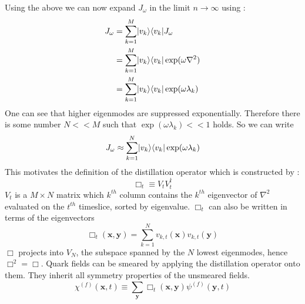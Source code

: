     Using the above we can now expand $J_\omega$ in the limit $n\rightarrow\infty$ using :
    \begin{equation}
        \begin{aligned}
            J_\omega &= \sum^M_{k=1}\lvert v_k\rangle\langle v_k\rvert J_\omega\\
            &= \sum^M_{k=1}\lvert v_k\rangle\langle v_k\rvert \exp(\omega\nabla^2)\\
            &= \sum^M_{k=1}\lvert v_k\rangle\langle v_k\rvert \exp(\omega\lambda_k)
        \end{aligned}
    \end{equation}
    One can see that higher eigenmodes are suppressed exponentially. Therefore there is some number $N<<M$ such that $\exp(\omega\lambda_k) << 1$ holds. So we can write
    \begin{equation}
        J_\omega \approx \sum^N_{k=1}\lvert v_k\rangle\langle v_k\rvert \exp(\omega\lambda_k)
    \end{equation}
    This motivates the definition of the distillation operator which is constructed by \cite{distillation_paper}:
    \begin{equation}
        \Box_t \equiv V_tV_t^\dagger
    \end{equation}
    $V_t$ is a $M \times N$ matrix which $k^{th}$ column contains the $k^{th}$ eigenvector of $\nabla^2$ evaluated on the $t^{th}$ timeslice, sorted by eigenvalue. $\Box_t$ can also be written in terms of the eigenvectors
    \begin{equation}
        \Box_{t}(\textbf{x},\textbf{y}) = \sum^N_{k=1}v_{k,t}(\textbf{x})v_{k,t}(\textbf{y})
    \end{equation}
    $\Box$ projects into $V_N$, the subspace spanned by the $N$ lowest eigenmodes, hence $\Box^2 = \Box$. Quark fields can be smeared by applying the distillation operator onto them. They inherit all symmetry properties of the unsmeared fields.
    \begin{equation}
        \chi^{(f)}(\textbf{x},t) \equiv \sum_{\textbf{y}} \Box_t(\textbf{x},\textbf{y}) \psi^{(f)}(\textbf{y},t)
    \end{equation}
    
